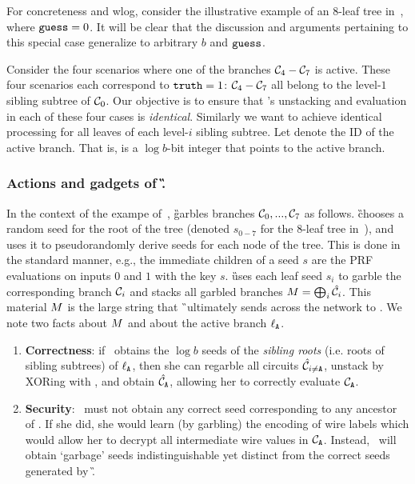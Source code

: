 For concreteness and wlog,
consider the illustrative example of an $8$-leaf tree in~, where $\mathtt{guess}=0$.  It will be clear that the discussion and arguments pertaining to this special case generalize to arbitrary $b$ and $\mathtt{guess}$.

Consider the four scenarios where one of the branches $\mathcal C_4-\mathcal C_7$ is active.
These four scenarios each correspond
to $\mathtt{truth} = 1$: $\mathcal C_4-\mathcal C_7$ all belong to the level-$1$ sibling subtree of
$\mathcal C_0$.
%
Our objective is to ensure that \E's unstacking and evaluation in each
of these four cases is \emph{identical}.  Similarly we want to achieve identical processing for all leaves of each level-$i$ sibling subtree.
Let \aid denote the ID of the active branch. That is, \aid is a $\log
b$-bit integer that points to the active branch.


\subsubsection{Actions and gadgets of \G.}

In the context of the exampe of~, \G  garbles branches  $\mathcal C_0,...,\mathcal C_7$ as follows.  \G chooses a random
seed for the root of the tree (denoted $s_{0-7}$ for the $8$-leaf tree
in~), and uses it to pseudorandomly derive seeds
for each node of the tree.  This is done in the standard manner, e.g.,
the immediate children of a seed $s$ are the PRF evaluations on inputs
$0$ and $1$ with the key $s$.
\G uses each leaf seed $s_i$ to garble the corresponding branch $\mathcal C_i$ and stacks all garbled branches $M=\bigoplus_i \hat{\mathcal C}_i$.  
%
This material $M$ is the large string that \G\ ultimately sends
across the network to \E.
We note two facts about $M$ and about the active branch $\mathtt{\ell_{A}}$.
\begin{enumerate}
  \item \textbf{Correctness}: if \E\ obtains the $\log b$ seeds of the
    \emph{sibling roots} (i.e. roots of sibling subtrees) of
    $\mathtt{\ell_{A}}$, then she can regarble all circuits $\hat{\mathcal C}_{i\neq \mathtt{A}}$,
    unstack by XORing with \mat, and obtain $\hat{\mathcal C}_{\mathtt{A}}$, allowing her to
    correctly evaluate $\mathcal C_{\mathtt{A}}$.
  \item \textbf{Security}: \E\ must not obtain any correct seed
    corresponding to any ancestor of \aid. If she did, she would learn (by garbling) the
    encoding of wire labels which would allow her to decrypt all
    intermediate wire values in $\mathcal C_{\mathtt{A}}$.
    Instead, \E\ will obtain `garbage' seeds indistinguishable yet
    distinct from the correct seeds generated by \G.
\end{enumerate}

